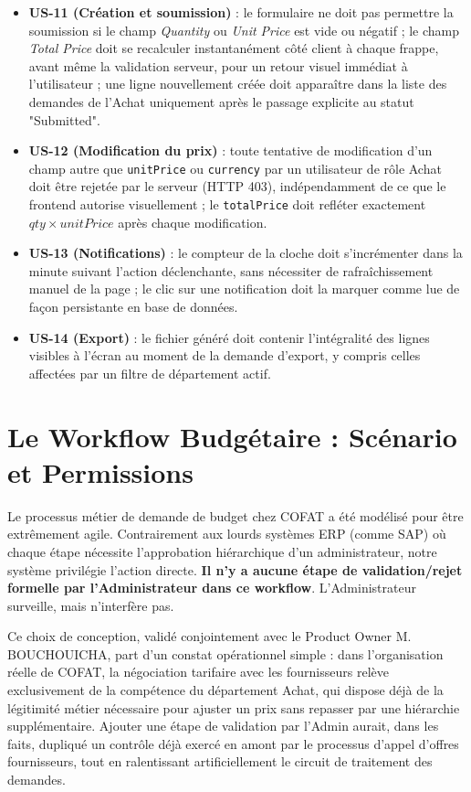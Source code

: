 \begin{itemize}
    \item \textbf{US-11 (Création et soumission)} : le formulaire ne doit pas permettre la soumission si le champ \textit{Quantity} ou \textit{Unit Price} est vide ou négatif ; le champ \textit{Total Price} doit se recalculer instantanément côté client à chaque frappe, avant même la validation serveur, pour un retour visuel immédiat à l'utilisateur ; une ligne nouvellement créée doit apparaître dans la liste des demandes de l'Achat uniquement après le passage explicite au statut "Submitted".
    \item \textbf{US-12 (Modification du prix)} : toute tentative de modification d'un champ autre que \texttt{unitPrice} ou \texttt{currency} par un utilisateur de rôle Achat doit être rejetée par le serveur (HTTP 403), indépendamment de ce que le frontend autorise visuellement ; le \texttt{totalPrice} doit refléter exactement $qty \times unitPrice$ après chaque modification.
    \item \textbf{US-13 (Notifications)} : le compteur de la cloche doit s'incrémenter dans la minute suivant l'action déclenchante, sans nécessiter de rafraîchissement manuel de la page ; le clic sur une notification doit la marquer comme lue de façon persistante en base de données.
    \item \textbf{US-14 (Export)} : le fichier généré doit contenir l'intégralité des lignes visibles à l'écran au moment de la demande d'export, y compris celles affectées par un filtre de département actif.
\end{itemize}

\section{Le Workflow Budgétaire : Scénario et Permissions}
Le processus métier de demande de budget chez COFAT a été modélisé pour être extrêmement agile. Contrairement aux lourds systèmes ERP (comme SAP) où chaque étape nécessite l'approbation hiérarchique d'un administrateur, notre système privilégie l'action directe. \textbf{Il n'y a aucune étape de validation/rejet formelle par l'Administrateur dans ce workflow}. L'Administrateur surveille, mais n'interfère pas.

Ce choix de conception, validé conjointement avec le Product Owner M. BOUCHOUICHA, part d'un constat opérationnel simple : dans l'organisation réelle de COFAT, la négociation tarifaire avec les fournisseurs relève exclusivement de la compétence du département Achat, qui dispose déjà de la légitimité métier nécessaire pour ajuster un prix sans repasser par une hiérarchie supplémentaire. Ajouter une étape de validation par l'Admin aurait, dans les faits, dupliqué un contrôle déjà exercé en amont par le processus d'appel d'offres fournisseurs, tout en ralentissant artificiellement le circuit de traitement des demandes.

